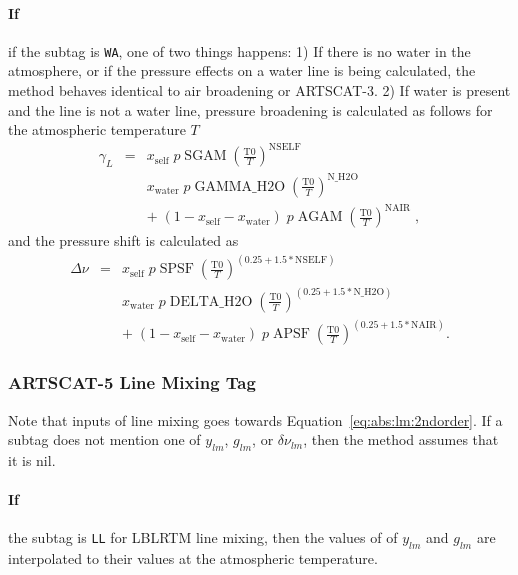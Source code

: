 \paragraph*{If} if the subtag is \verb|WA|, one of two things happens:
1) If there is no water in the atmosphere, or if the pressure effects on a water
line is being calculated, the method behaves identical to air broadening or ARTSCAT-3.
2) If water is present and the line is not a water line, pressure broadening 
is calculated as follows for the atmospheric temperature $T$
\begin{eqnarray}
  \gamma_L &=& x_\mathrm{self} \; p \; \mathrm{SGAM} \; 
             \left(
             \frac{\mathrm{T0}}{T}
             \right)^{\mathrm{NSELF}} \nonumber \\
           & &
           x_\mathrm{water} \; p \; \mathrm{GAMMA\_H2O} \; 
             \left(
             \frac{\mathrm{T0}}{T}
             \right)^{\mathrm{N\_H2O}} \nonumber \\
           & &
             + \; (1-x_\mathrm{self}-x_\mathrm{water}) \; p \; \mathrm{AGAM} \; 
             \left(
             \frac{\mathrm{T0}}{T}
             \right)^{\mathrm{NAIR}} \;,
\end{eqnarray}
and the pressure shift is calculated as
\begin{eqnarray}
  \Delta \nu &=& x_\mathrm{self} \; p \; \mathrm{SPSF} \; 
             \left(
             \frac{\mathrm{T0}}{T}
             \right)^{(0.25 + 1.5 * \mathrm{NSELF})} \nonumber \\
           & &
           x_\mathrm{water} \; p \; \mathrm{DELTA\_H2O} \; 
             \left(
             \frac{\mathrm{T0}}{T}
             \right)^{(0.25 + 1.5 * \mathrm{N\_H2O})} \nonumber \\
           & &
             + \; (1-x_\mathrm{self}-x_\mathrm{water}) \; p \; \mathrm{APSF} \; 
             \left(
             \frac{\mathrm{T0}}{T}
             \right)^{(0.25 + 1.5 * \mathrm{NAIR})}.
\end{eqnarray}

\subsubsection{ARTSCAT-5 Line Mixing Tag}
Note that inputs of line mixing goes towards Equation~\ref{eq:abs:lm:2ndorder}.  If a subtag does not mention one of $y_{lm}$, $g_{lm}$, or $\delta\nu_{lm}$,
then the method assumes that it is nil.
\paragraph*{If} the subtag is \verb|LL| for LBLRTM line mixing,
then the values of of $y_{lm}$ and $g_{lm}$ are interpolated to their values at the atmospheric temperature.

